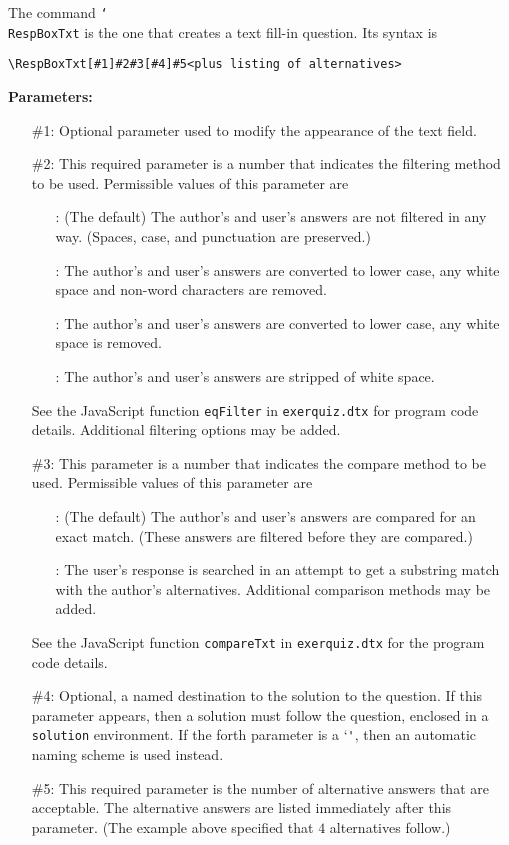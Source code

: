 \documentclass{article}
\newcommand{\cs}[1]{\texttt{\char`\\#1}}
\begin{document}
\medskip\noindent
The command \cs{RespBoxTxt} is the one that creates a text
fill-in question. Its syntax is
\begin{verbatim}
\RespBoxTxt[#1]#2#3[#4]#5<plus listing of alternatives>
\end{verbatim}
\noindent\textbf{\hypertarget{paraRespBoxTxt}{Parameters:}}
\begin{enumerate}
\item[\ttfamily\#1:]Optional parameter used to modify the
    appearance of the text field.
\item[\ttfamily\#2:]This required parameter is a number that
    indicates the filtering method to be used. Permissible
    values of this parameter are
\begin{enumerate}
    \item[\ttfamily-1:] (The default) The author's and
        user's answers are not filtered in any way. (Spaces,
        case, and punctuation are preserved.)
    \item[\ttfamily0:] The author's and user's answers are
        converted to lower case, any white space and
        non-word characters are removed.
    \item[\ttfamily1:] The author's and user's answers are
        converted to lower case, any white space is removed.
    \item[\ttfamily2:] The author's and user's answers are
        stripped of white space.
\end{enumerate}
See the JavaScript function \texttt{eqFilter} in
\texttt{exerquiz.dtx} for program code details.  Additional
filtering options may be added.

\item[\ttfamily\#3:] This parameter is a number that indicates
    the compare method to be used. Permissible values of this
    parameter are
\begin{enumerate}
    \item[\ttfamily0:] (The default) The author's and user's
        answers are compared for an exact match. (These
        answers are filtered before they are compared.)
    \item[\ttfamily1:] The user's response is searched in an
        attempt to get a substring match with the author's
        alternatives. Additional comparison methods may be
        added.
\end{enumerate}
See the JavaScript function \texttt{compareTxt} in
\texttt{exerquiz.dtx} for the program code details.

\item[\ttfamily\#4:] Optional, a named destination to the
    solution to the question. If this parameter appears, then
    a solution must follow the question, enclosed in a
    \texttt{solution} environment.  If the forth parameter is
    a `\texttt*', then an automatic naming scheme is used
    instead.
\item[\ttfamily\#5:] This required parameter is the number of
    alternative answers that are acceptable. The alternative
    answers are listed immediately after this parameter. (The
    example above specified that $4$ alternatives follow.)
\end{enumerate}
\end{document}
